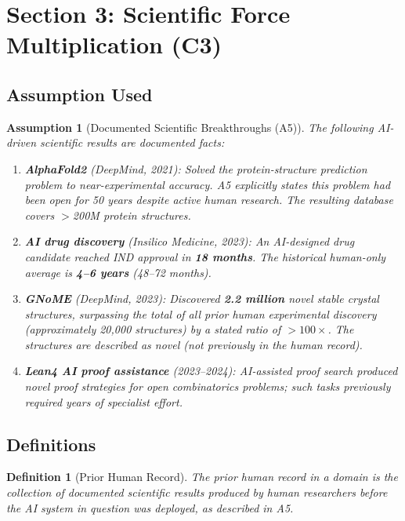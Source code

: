 \documentclass[12pt]{article}
\newtheorem{assumption}{Assumption}
\newtheorem{definition}{Definition}
\begin{document}
\section*{Section 3: Scientific Force Multiplication (C3)}

\subsection*{Assumption Used}

\begin{assumption}[Documented Scientific Breakthroughs (A5)]\label{A5}
  The following AI-driven scientific results are documented facts:
  \begin{enumerate}
    \item \textbf{AlphaFold2} (DeepMind, 2021): Solved the protein-structure
      prediction problem to near-experimental accuracy.  A5 explicitly states
      this problem had been \emph{open for 50 years} despite active human research.
      The resulting database covers $>$200M protein structures.
    \item \textbf{AI drug discovery} (Insilico Medicine, 2023): An AI-designed
      drug candidate reached IND approval in \textbf{18 months}.  The
      historical human-only average is \textbf{4--6 years} (48--72 months).
    \item \textbf{GNoME} (DeepMind, 2023): Discovered \textbf{2.2 million}
      novel stable crystal structures, surpassing the total of all prior
      human experimental discovery (approximately 20{,}000 structures) by a
      stated ratio of $>100\times$.  The structures are described as novel
      (not previously in the human record).
    \item \textbf{Lean4 AI proof assistance} (2023--2024): AI-assisted proof
      search produced \emph{novel proof strategies} for \emph{open}
      combinatorics problems; such tasks previously required years of
      specialist effort.
  \end{enumerate}
\end{assumption}

\subsection*{Definitions}

\begin{definition}[Prior Human Record]\label{def:record}
  The \emph{prior human record} in a domain is the collection of documented
  scientific results produced by human researchers before the AI system
  in question was deployed, as described in A5.
\end{definition}
\end{document}
